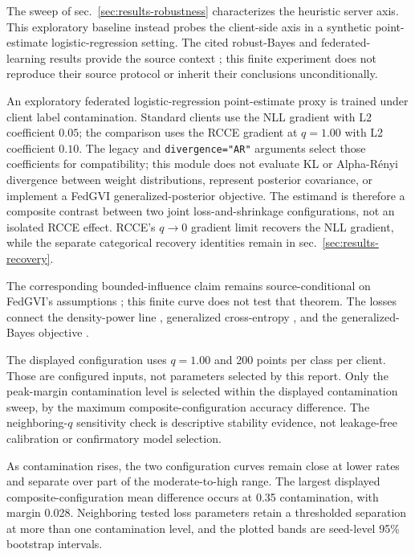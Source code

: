 \documentclass[
  english,
]{article}
\theoremstyle{plain}
\theoremstyle{definition}
\theoremstyle{remark}
\theoremstyle{definition}
\begin{document}
The sweep of sec.~\ref{sec:results-robustness} characterizes the
heuristic server axis. This exploratory baseline instead probes the
client-side axis in a synthetic point-estimate logistic-regression
setting. The cited robust-Bayes and federated- learning results provide
the source context
\citep{mcmahan2017communication, ashman2022partitioned, bui2018partitioned};
this finite experiment does not reproduce their source protocol or
inherit their conclusions unconditionally.

An exploratory federated logistic-regression point-estimate proxy is
trained under client label contamination. Standard clients use the NLL
gradient with L2 coefficient \(0.05\); the comparison uses the RCCE
gradient at \(q=1.00\) with L2 coefficient \(0.10\). The legacy
 and \texttt{divergence="AR"} arguments select
those coefficients for compatibility; this module does not evaluate KL
or Alpha-Rényi divergence between weight distributions, represent
posterior covariance, or implement a FedGVI generalized-posterior
objective. The estimand is therefore a composite contrast between two
joint loss-and-shrinkage configurations, not an isolated RCCE effect.
RCCE's \(q\to0\) gradient limit recovers the NLL gradient, while the
separate categorical recovery identities remain in
sec.~\ref{sec:results-recovery}.

The corresponding bounded-influence claim remains source-conditional on
FedGVI's assumptions \citep{mildner2025fedgvi}; this finite curve does
not test that theorem. The losses connect the density-power line
\citep{basu1998robust}, generalized cross-entropy
\citep{zhang2018generalized}, and the generalized-Bayes objective
\citep{bissiri2016general, knoblauch2022generalized}.

The displayed configuration uses \(q = 1.00\) and 200 points per class
per client. Those are configured inputs, not parameters selected by this
report. Only the peak-margin contamination level is selected within the
displayed contamination sweep, by the maximum composite-configuration
accuracy difference. The neighboring-\(q\) sensitivity check is
descriptive stability evidence, not leakage-free calibration or
confirmatory model selection.

As contamination rises, the two configuration curves remain close at
lower rates and separate over part of the moderate-to-high range. The
largest displayed composite-configuration mean difference occurs at 0.35
contamination, with margin 0.028. Neighboring tested loss parameters
retain a thresholded separation at more than one contamination level,
and the plotted bands are seed-level 95\% bootstrap intervals.
\end{document}
